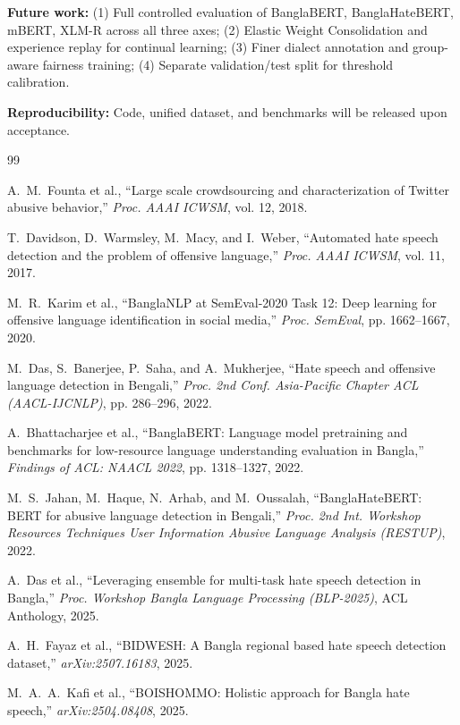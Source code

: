 \documentclass[conference]{IEEEtran}
\begin{document}
\textbf{Future work:} (1) Full controlled evaluation of BanglaBERT, BanglaHateBERT, mBERT, XLM-R across all three axes; (2) Elastic Weight Consolidation and experience replay for continual learning; (3) Finer dialect annotation and group-aware fairness training; (4) Separate validation/test split for threshold calibration.

\textbf{Reproducibility:} Code, unified dataset, and benchmarks will be released upon acceptance.

\begin{thebibliography}{99}

A.~M.~Founta et al., ``Large scale crowdsourcing and characterization of Twitter abusive behavior,'' \textit{Proc. AAAI ICWSM}, vol. 12, 2018.

T.~Davidson, D.~Warmsley, M.~Macy, and I.~Weber, ``Automated hate speech detection and the problem of offensive language,'' \textit{Proc. AAAI ICWSM}, vol. 11, 2017.

M.~R.~Karim et al., ``BanglaNLP at SemEval-2020 Task 12: Deep learning for offensive language identification in social media,'' \textit{Proc. SemEval}, pp. 1662--1667, 2020.

M.~Das, S.~Banerjee, P.~Saha, and A.~Mukherjee, ``Hate speech and offensive language detection in Bengali,'' \textit{Proc. 2nd Conf. Asia-Pacific Chapter ACL (AACL-IJCNLP)}, pp. 286--296, 2022.

A.~Bhattacharjee et al., ``BanglaBERT: Language model pretraining and benchmarks for low-resource language understanding evaluation in Bangla,'' \textit{Findings of ACL: NAACL 2022}, pp. 1318--1327, 2022.

M.~S.~Jahan, M.~Haque, N.~Arhab, and M.~Oussalah, ``BanglaHateBERT: BERT for abusive language detection in Bengali,'' \textit{Proc. 2nd Int. Workshop Resources Techniques User Information Abusive Language Analysis (RESTUP)}, 2022.

A.~Das et al., ``Leveraging ensemble for multi-task hate speech detection in Bangla,'' \textit{Proc. Workshop Bangla Language Processing (BLP-2025)}, ACL Anthology, 2025.

A.~H.~Fayaz et al., ``BIDWESH: A Bangla regional based hate speech detection dataset,'' \textit{arXiv:2507.16183}, 2025.

M.~A.~A.~Kafi et al., ``BOISHOMMO: Holistic approach for Bangla hate speech,'' \textit{arXiv:2504.08408}, 2025.


\end{thebibliography}
\end{document}
